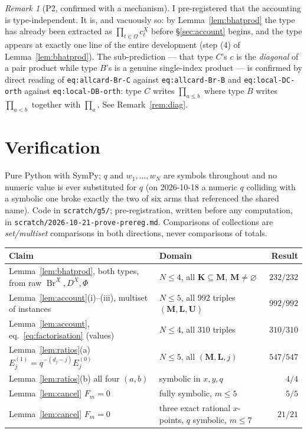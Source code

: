 \documentclass[11pt]{article}
\theoremstyle{plain}
\theoremstyle{definition}
\theoremstyle{remark}
\newtheorem{rem}[thm]{Remark}
\newcommand{\bM}{\mathbf M}
\newcommand{\bK}{\mathbf K}
\newcommand{\bL}{\mathbf L}
\newcommand{\bU}{\mathbf U}
\newcommand{\Br}{\operatorname{Br}}
\newcommand{\Om}{\Omega}
\begin{document}
\begin{rem}[P2, confirmed with a mechanism]
I pre-registered that the accounting is type-independent. It is, and vacuously so:
by Lemma~\ref{lem:bhatprod} the type has already been extracted as
$\prod_{t\in\Om}c^X_t$ before \S\ref{sec:account} begins, and the type appears at
exactly one line of the entire development (step (4) of
Lemma~\ref{lem:bhatprod}). The sub-prediction --- that type $C$'s $c$ is the
\emph{diagonal} of a pair product while type $B$'s is a genuine single-index
product --- is confirmed by direct reading of \texttt{eq:allcard-Br-C} against
\texttt{eq:allcard-Br-B} and \texttt{eq:local-DC-orth} against
\texttt{eq:local-DB-orth}: type $C$ writes $\prod_{a\le b}$ where type $B$ writes
$\prod_{a<b}$ together with $\prod_a$. See Remark~\ref{rem:diag}.
\end{rem}

\section{Verification}
\label{sec:verif}

Pure Python with SymPy; $q$ and $w_1,\dots,w_N$ are symbols throughout and no
numeric value is ever substituted for $q$ (on 2026-10-18 a numeric $q$ colliding
with a symbolic one broke exactly the two of six arms that referenced the shared
name). Code in \texttt{scratch/g5/}; pre-registration, written before any
computation, in \texttt{scratch/2026-10-21-prove-prereg.md}. Comparisons of
collections are \emph{set/multiset} comparisons in both directions, never
comparisons of totals.

\begin{center}
\small
\begin{tabular}{llr}
\hline
\textbf{Claim} & \textbf{Domain} & \textbf{Result}\\
\hline
Lemma~\ref{lem:bhatprod}, both types, from raw $\Br^X,D^X,\Phi$
 & $N\le4$, all $\bK\subseteq\bM$, $\bM\ne\varnothing$ & $232/232$\\
Lemma~\ref{lem:account}(i)--(iii), multiset of instances
 & $N\le5$, all $992$ triples $(\bM,\bL,\bU)$ & $992/992$\\
Lemma~\ref{lem:account}, eq.~\eqref{eq:factorisation} (values)
 & $N\le4$, all $310$ triples & $310/310$\\
Lemma~\ref{lem:ratios}(a) $E_j^{(1)}=q^{-(d_j-j)}E_j^{(0)}$
 & $N\le5$, all $(\bM,\bL,j)$ & $547/547$\\
Lemma~\ref{lem:ratios}(b) all four $(a,b)$ & symbolic in $x,y,q$ & $4/4$\\
Lemma~\ref{lem:cancel} $F_m=0$ & fully symbolic, $m\le5$ & $5/5$\\
Lemma~\ref{lem:cancel} $F_m=0$ & three exact rational $x$-points, $q$ symbolic, $m\le7$ & $21/21$\\
\hline
\end{tabular}
\end{center}
\end{document}
